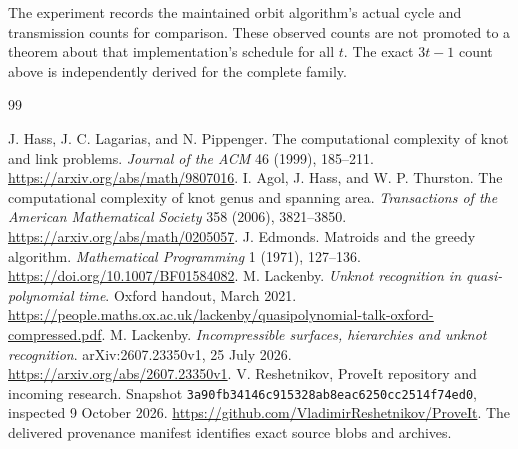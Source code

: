 \documentclass[11pt,a4paper]{article}
\theoremstyle{definition}
\newcommand{\code}[1]{{\small\nolinkurl{#1}}}
\begin{document}
The experiment records the maintained orbit algorithm's actual cycle and
transmission counts for comparison.  These observed counts are not promoted
to a theorem about that implementation's schedule for all $t$.  The exact
$3t-1$ count above is independently derived for the complete family.






\clearpage
\begin{thebibliography}{99}
\raggedright
{} J. Hass, J. C. Lagarias, and N. Pippenger.
 The computational complexity of knot and link problems.
 \emph{Journal of the ACM} 46 (1999), 185--211.
 \url{https://arxiv.org/abs/math/9807016}.
 I. Agol, J. Hass, and W. P. Thurston.
 The computational complexity of knot genus and spanning area.
 \emph{Transactions of the American Mathematical Society} 358 (2006), 3821--3850.
 \url{https://arxiv.org/abs/math/0205057}.
 J. Edmonds. Matroids and the greedy algorithm.
 \emph{Mathematical Programming} 1 (1971), 127--136.
 \url{https://doi.org/10.1007/BF01584082}.
 M. Lackenby.
 \emph{Unknot recognition in quasi-polynomial time}. Oxford handout, March 2021.
 \url{https://people.maths.ox.ac.uk/lackenby/quasipolynomial-talk-oxford-compressed.pdf}.
 M. Lackenby.
 \emph{Incompressible surfaces, hierarchies and unknot recognition}.
 arXiv:2607.23350v1, 25 July 2026.
 \url{https://arxiv.org/abs/2607.23350v1}.
 V. Reshetnikov, ProveIt repository and incoming research.
 Snapshot \code{3a90fb34146c915328ab8eac6250cc2514f74ed0}, inspected 9 October 2026.
 \url{https://github.com/VladimirReshetnikov/ProveIt}.
 The delivered provenance manifest identifies exact source blobs and archives.
\end{thebibliography}
\end{document}
